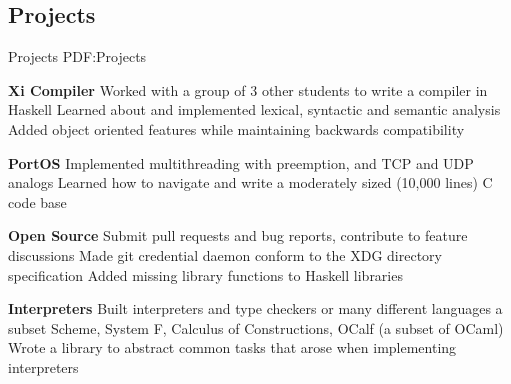 \documentclass[letterpaper,10pt,oneside]{simpleresume}
\begin{document}
\begin{minipage}[t][0pt]{\linewidth}
\begin{body}
\section%
{Projects}
{Projects}
{PDF:Projects}

\textbf{Xi Compiler}
\BulletItem%
Worked with a group of 3 other students to write a compiler in Haskell
\BulletItem%
Learned about and implemented lexical, syntactic and semantic analysis
\BulletItem%
Added object oriented features while maintaining backwards compatibility
\GapNoBreak%

\textbf{PortOS}
\BulletItem%
Implemented multithreading with preemption, and TCP and UDP analogs
\BulletItem%
Learned how to navigate and write a moderately sized (10,000 lines) C code base
\GapNoBreak%

\textbf{Open Source}
\BulletItem%
Submit pull requests and bug reports, contribute to feature discussions
\BulletItem%
Made git credential daemon conform to the XDG directory specification
\BulletItem%
Added missing library functions to Haskell libraries
\GapNoBreak%

\textbf{Interpreters}
\BulletItem%
Built interpreters and type checkers or many different languages
\BulletItem%
a subset Scheme, System F, Calculus of Constructions, OCalf (a subset of OCaml)
\BulletItem%
Wrote a library to abstract common tasks that arose when implementing
interpreters
\GapNoBreak%






\end{body}
\end{minipage}
\end{document}
